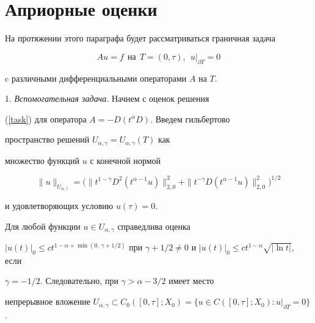 \section{Априорные оценки} \label{ApriorEstim}





На протяжении этого параграфа будет рассматриваться граничная задача


\begin{equation}\label{task}


A u=f \ \ \text{на} \ \ T=(0,\tau), \ \ u|_{\partial T}=0


\end{equation}


c различными дифференциальными операторами $A$ на $T$.


\smallskip





1. {\it Вспомогательная задача.} Начнем с оценок решения


(\ref{task}) для оператора $A=-D(t^\alpha D)$. Введем гильбертово


пространство решений $U_{\alpha,\gamma}=U_{\alpha,\gamma}(T)$ как


множество функций $u$ с конечной нормой


$$




\|u\|_{U_{\alpha,\gamma}}=\big(\|t^{1-\gamma}D^2(t^{\alpha-1}u)\|_{2,0}^2


+\|t^{-\gamma}D(t^{\alpha-1}u)\|_{2,0}^2\big)^{1/2}




$$


и удовлетворяющих условию $u(\tau)=0$.





\begin{lems}\label{Uag}


Для любой функции $u \in U_{\alpha,\gamma}$ справедлива оценка


$|u(t)|_0 \le ct^{1-\alpha+\min(0,\,\gamma+1/2)}$ при $\gamma+1/2


\ne 0$ и $|u(t)|_0 \le ct^{1-\alpha}\sqrt{|\ln t|}$, если


$\gamma=-1/2$. Следовательно, при $\gamma >\alpha-3/2$ имеет место


непрерывное вложение $U_{\alpha,\gamma} \subset


C_0([0,\tau];X_0)=\{u \in C([0,\tau];X_0): u|_{\partial T}=0\}$.


\end{lems}





